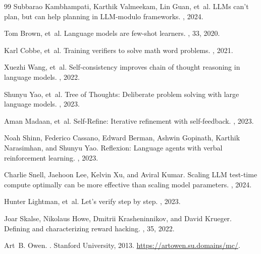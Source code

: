 \documentclass[11pt,a4paper]{article}
\begin{document}
\begin{thebibliography}{99}
Subbarao Kambhampati, Karthik Valmeekam, Lin Guan, et~al.
\newblock LLMs can't plan, but can help planning in LLM-modulo frameworks.
, 2024.

Tom Brown, et~al.
\newblock Language models are few-shot learners.
, 33, 2020.

Karl Cobbe, et~al.
\newblock Training verifiers to solve math word problems.
, 2021.

Xuezhi Wang, et~al.
\newblock Self-consistency improves chain of thought reasoning in language models.
, 2022.

Shunyu Yao, et~al.
\newblock Tree of Thoughts: Deliberate problem solving with large language models.
, 2023.

Aman Madaan, et~al.
\newblock Self-Refine: Iterative refinement with self-feedback.
, 2023.

Noah Shinn, Federico Cassano, Edward Berman, Ashwin Gopinath, Karthik Narasimhan, and Shunyu Yao.
\newblock Reflexion: Language agents with verbal reinforcement learning.
, 2023.

Charlie Snell, Jaehoon Lee, Kelvin Xu, and Aviral Kumar.
\newblock Scaling LLM test-time compute optimally can be more effective than scaling model parameters.
, 2024.

Hunter Lightman, et~al.
\newblock Let's verify step by step.
, 2023.

Joar Skalse, Nikolaus Howe, Dmitrii Krasheninnikov, and David Krueger.
\newblock Defining and characterizing reward hacking.
, 35, 2022.

Art~B. Owen.
.
\newblock Stanford University, 2013. \url{https://artowen.su.domains/mc/}.


\end{thebibliography}
\end{document}
